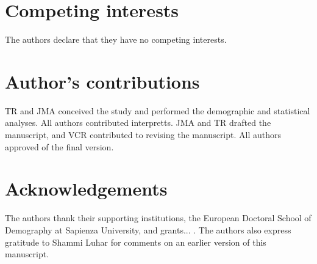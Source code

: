 \documentclass{bmcart}
\begin{document}
\begin{backmatter}

\section*{Competing interests}
  The authors declare that they have no competing interests.

\section*{Author's contributions}
TR and JMA conceived the study and performed the demographic and statistical analyses. All authors contributed interpretts. JMA and TR drafted the manuscript, and VCR contributed to revising the manuscript. All authors approved of the final version.
 
\section*{Acknowledgements}
The authors thank their supporting institutions, the European Doctoral School of Demography at Sapienza University, and grants... . The authors also express gratitude to Shammi Luhar for comments on an earlier version of this manuscript.



\end{backmatter}
\end{document}
